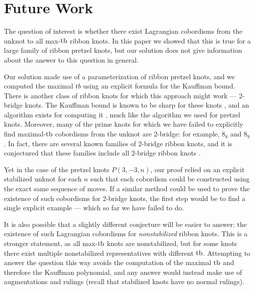 \chapter{Future Work}\label{ch:future}

The question of interest is whether there exist Lagrangian cobordisms from the unknot to all max-$\operatorname{tb}$ ribbon knots. In this paper we showed that this is true for a large family of ribbon pretzel knots, but our solution does not give information about the answer to this question in general. 

Our solution made use of a parameterization of ribbon pretzel knots, and we computed the maximal $tb$ using an explicit formula for the Kauffman bound. There is another class of ribbon knots for which this approach might work --- 2-bridge knots.
The Kauffman bound is known to be sharp for these knots \cite{ng}, and an algorithm exists for computing it \cite{luzhong-2bridge}, much like the algorithm we used for pretzel knots.
Moreover, many of the prime knots for which we have failed to explicitly find maximal-$\operatorname{tb}$ cobordisms from the unknot are 2-bridge: for example, $8_8$ and $8_9$. In fact, there are several known families of 2-bridge ribbon knots, and it is conjectured that these families include all 2-bridge ribbon knots \cite{lamm}.

Yet in the case of the pretzel knots $P(3, -3, n)$, our proof relied on an explicit stabilized unknot for each $n$ such that each cobordism could be constructed using the exact same sequence of moves.
If a similar method could be used to prove the existence of such cobordisms for 2-bridge knots, the first step would be to find a single explicit example --- which so far we have failed to do.

It is also possible that a slightly different conjecture will be easier to answer: the existence of such Lagrangian cobordisms for \emph{nonstabilized} ribbon knots. This is a stronger statement, as all max-$\operatorname{tb}$ knots are nonstabilized, but for some knots there exist multiple nonstabilized representatives with different $\operatorname{tb}$. Attempting to answer the question this way avoids the computation of the maximal $\operatorname{tb}$ and therefore the Kauffman polynomial, and any answer would instead make use of augmentations and rulings (recall that stabilized knots have no normal rulings).


